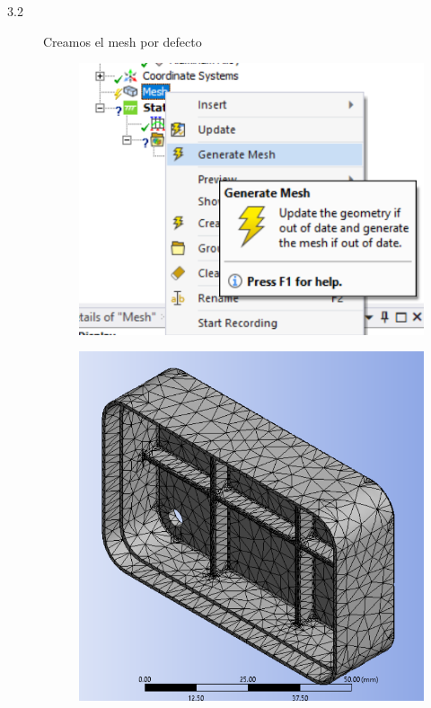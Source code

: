 \documentclass{article}
\begin{document}
\begin{description}
\begin{description}
        \item[3.2 ] Creamos el mesh por defecto 
        \begin{figure}[h!]
            \centering
            \includegraphics{img/generarMesh.png}
        \end{figure}

        \bigskip

        \begin{figure}[h!]
            \centering
            \includegraphics[scale=0.5]{img/malla.png}
        \end{figure}
    \end{description}
\end{description}

 
 
\end{document}
